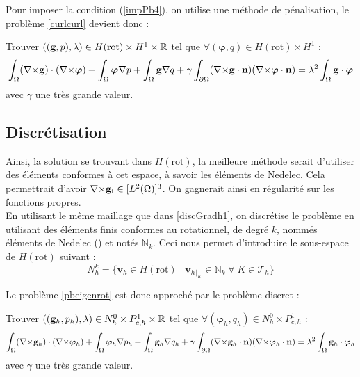 Pour imposer la condition (\ref{impPb4}), on utilise une méthode de pénalisation, le problème \ref{curlcurl} devient donc :
\begin{pb}\label{pbeigenrot}
Trouver $((\mathbf{g},p),\lambda)\in H(\mathrm{rot}) \times H^1 \times {\mathbb{R}}$ tel que $\forall (\bm{\varphi},q)\in H(\mathrm{rot}) \times H^1$ :
\begin{equation*}
\int_\Omega ({\nabla\times}\mathbf{g})\cdot({\nabla\times}\bm{\varphi}) + \int_\Omega\bm{\varphi}{\nabla} p + \int_\Omega \mathbf{g}{\nabla} q + \gamma\int_{\partial\Omega}({\nabla\times}\mathbf{g}\cdot\mathbf{n})({\nabla\times}\bm{\varphi}\cdot\mathbf{n}) = \lambda^2\int_\Omega \mathbf{g}\cdot\bm{\varphi}
\end{equation*}
avec $\gamma$ une très grande valeur.
\end{pb}

\subsection{Discrétisation}
Ainsi, la solution se trouvant dans $H(\mathrm{rot})$, la meilleure méthode serait d'utiliser des éléments conformes à cet espace, à savoir les éléments de Nedelec. Cela permettrait d'avoir ${\nabla\times}\mathbf{g_i}\in [L^2(\Omega)]^3$. On gagnerait ainsi en régularité sur les fonctions propres.\\

En utilisant le même maillage que dans \ref{discGradh1}, on discrétise le problème en utilisant des éléments finis conformes au rotationnel, de degré $k$, nommés éléments de Nedelec (\cite{Nedelec80,Nedelec86}) et notés $\mathbb{N}_k$. Ceci nous permet d'introduire le sous-espace de $H(\mathrm{rot})$ suivant :
\[ N^k_h = \{ \mathbf{v}_h \in H(\mathrm{rot}) \; |\; \mathbf{v}_h{}_{|_K} \in \mathbb{N}_k\; \forall\; K \in \mathcal{T}_h\}\]

Le problème \ref{pbeigenrot} est donc approché par le problème discret :
\begin{pb}
Trouver $((\mathbf{g}_h,p_h),\lambda)\in N^0_h\times P_{c,h}^1 \times {\mathbb{R}}$ tel que $\forall  (\bm{\varphi}_h,q_h)\in N^0_h\times P_{c,h}^1$ :
\begin{equation*}
\int_\Omega ({\nabla\times}\mathbf{g}_h)\cdot({\nabla\times}\bm{\varphi}_h) + \int_\Omega\bm{\varphi}_h{\nabla} p_h + \int_\Omega \mathbf{g}_h{\nabla} q_h + \gamma\int_{\partial\Omega}({\nabla\times}\mathbf{g}_h\cdot\mathbf{n})({\nabla\times}\bm{\varphi}_h\cdot\mathbf{n}) = \lambda^2\int_\Omega \mathbf{g}_h\cdot\bm{\varphi}_h
\end{equation*}
avec $\gamma$ une très grande valeur.
\end{pb}

